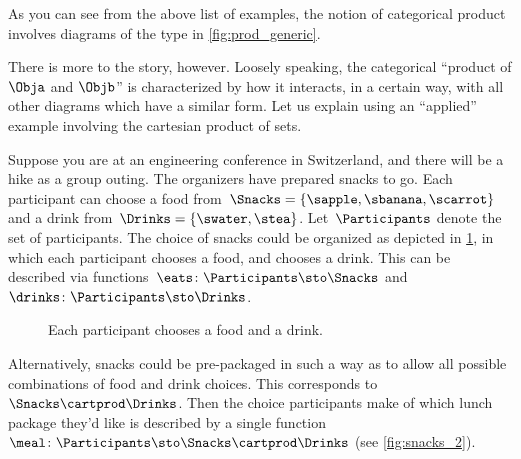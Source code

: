
As you can see from the above list of examples, the notion of categorical product involves diagrams of the type in \cref{fig:prod_generic}.

\begin{marginfigure}
    \centering
    \caption{}
    \label{fig:prod_generic}
\end{marginfigure}
There is more to the story, however.
Loosely speaking, the categorical ``product of $\Obja$ and $\Objb$'' is characterized by how it interacts, in a certain way, with all other diagrams which have a similar form.
Let us explain using an ``applied'' example involving the cartesian product of sets.

Suppose you are at an engineering conference in Switzerland, and there will be a hike as a group outing.
The organizers have prepared snacks to go.
Each participant can choose a food from~$\Snacks=\{\sapple,\sbanana,\scarrot\}$ and a drink from~$\Drinks=\{\swater,\stea\}$.
Let~$\Participants$ denote the set of participants.
The choice of snacks could be organized as depicted in \cref{fig:snacks_1}, in which each participant chooses a food, and chooses a drink.
This can be described via functions~$\eats \colon \Participants \sto \Snacks$ and~$\drinks \colon  \Participants \sto \Drinks$.

\begin{figure}[h!]
    \centering
    \caption{Each participant chooses a food and a drink.}
    \label{fig:snacks_1}
\end{figure}

Alternatively, snacks could be pre-packaged in such a way as to allow all possible combinations of food and drink choices.
This corresponds to~$\Snacks\cartprod \Drinks$.
Then the choice participants make of which lunch package they'd like is described by a single function~$\meal \colon \Participants\sto \Snacks\cartprod \Drinks$ (see \cref{fig:snacks_2}).


